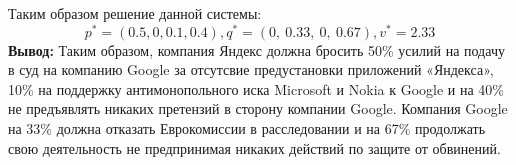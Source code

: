 \documentclass[12pt,a4paper]{article}
\begin{document}
Таким образом решение данной системы:
\begin{equation*}
p^{*} =( 0.5,0,0.1,0.4) ,q^{*} =( 0,\ 0.33,\ 0,\ 0.67) ,v^{*} =2.33
\end{equation*}
\textbf{Вывод: }Таким образом, компания Яндекс должна бросить 50\% усилий на подачу в суд на компанию Google за отсутсвие предустановки приложений «Яндекса», 10\% на поддержку антимонопольного иска Microsoft и Nokia к Google и на 40\% не предъявлять никаких претензий в сторону компании Google. Компания Google на 33\% должна отказать Еврокомиссии в расследовании и на 67\% продолжать свою деятельность не предпринимая никаких действий по защите от обвинений.
\end{document}
